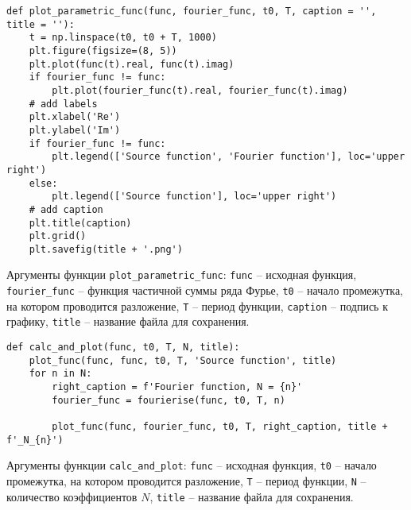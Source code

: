 \begin{lstlisting}[style=python_white, caption=Функция для отрисовки графиков (параметрическая функция), label=lst:plot_parametric_func]
def plot_parametric_func(func, fourier_func, t0, T, caption = '', title = ''):
    t = np.linspace(t0, t0 + T, 1000)
    plt.figure(figsize=(8, 5))
    plt.plot(func(t).real, func(t).imag)
    if fourier_func != func:
        plt.plot(fourier_func(t).real, fourier_func(t).imag)
    # add labels
    plt.xlabel('Re')
    plt.ylabel('Im')
    if fourier_func != func:
        plt.legend(['Source function', 'Fourier function'], loc='upper right')
    else:
        plt.legend(['Source function'], loc='upper right')
    # add caption
    plt.title(caption)
    plt.grid()
    plt.savefig(title + '.png') 
\end{lstlisting}
Аргументы функции \texttt{plot\_parametric\_func}: \texttt{func} -- исходная функция, \texttt{fourier\_func} -- функция частичной суммы ряда Фурье, \texttt{t0} -- начало промежутка, на котором проводится разложение, \texttt{T} -- период функции, \texttt{caption} -- подпись к графику, \texttt{title} -- название файла для сохранения.
\newline

\begin{lstlisting}[style=python_white, caption=Функция для разложения в ряд Фурье с различными значениями $N$, label=lst:calc_and_plot]
def calc_and_plot(func, t0, T, N, title):
    plot_func(func, func, t0, T, 'Source function', title)
    for n in N:
        right_caption = f'Fourier function, N = {n}'
        fourier_func = fourierise(func, t0, T, n)
        
        plot_func(func, fourier_func, t0, T, right_caption, title + f'_N_{n}')
\end{lstlisting}
Аргументы функции \texttt{calc\_and\_plot}: \texttt{func} -- исходная функция, \texttt{t0} -- начало промежутка, на котором проводится разложение, \texttt{T} -- период функции, \texttt{N} -- количество коэффициентов $N$, \texttt{title} -- название файла для сохранения.
\newline

